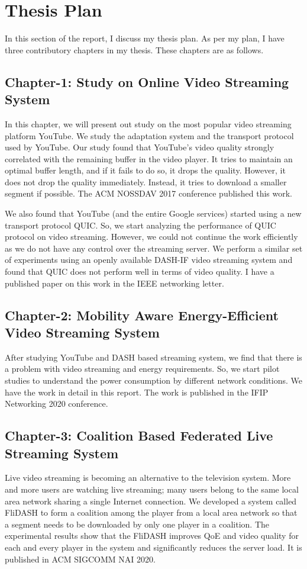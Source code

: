 \section{Thesis Plan}
In this section of the report, I discuss my thesis plan. As per my plan, I have three contributory chapters in my thesis. These chapters are as follows.

\subsection{Chapter-1: Study on Online Video Streaming System}
In this chapter, we will present out study on the most popular video streaming platform YouTube. We study the adaptation system and the transport protocol used by YouTube. Our study found that YouTube's video quality strongly correlated with the remaining buffer in the video player. It tries to maintain an optimal buffer length, and if it fails to do so, it drops the quality. However, it does not drop the quality immediately. Instead, it tries to download a smaller segment if possible. The ACM NOSSDAV 2017 conference published this work.

We also found that YouTube (and the entire Google services) started using a new transport protocol QUIC. So, we start analyzing the performance of QUIC protocol on video streaming. However, we could not continue the work efficiently as we do not have any control over the streaming server. We perform a similar set of experiments using an openly available DASH-IF video streaming system and found that QUIC does not perform well in terms of video quality. I have a published paper on this work in the IEEE networking letter.

\subsection{Chapter-2: Mobility Aware Energy-Efficient Video Streaming System}
After studying YouTube and DASH based streaming system, we find that there is a problem with video streaming and energy requirements. So, we start pilot studies to understand the power consumption by different network conditions. We have the work in detail in this report. The work is published in the IFIP Networking 2020 conference.

\subsection{Chapter-3: Coalition Based Federated Live Streaming System}
Live video streaming is becoming an alternative to the television system. More and more users are watching live streaming; many users belong to the same local area network sharing a single Internet connection. We developed a system called FliDASH to form a coalition among the player from a local area network so that a segment needs to be downloaded by only one player in a coalition. The experimental results show that the FliDASH improves QoE and video quality for each and every player in the system and significantly reduces the server load. It is published in ACM SIGCOMM NAI 2020.

